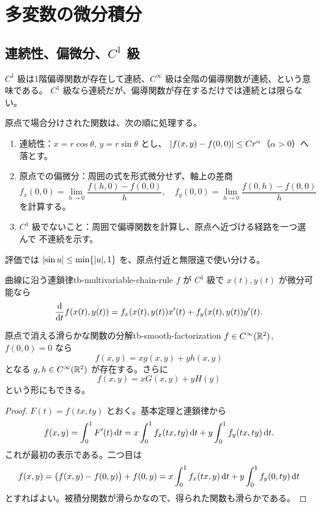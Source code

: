 \chapter{多変数の微分積分}
\label{ch:tb-multivariable}

\section{連続性、偏微分、\texorpdfstring{$C^1$ 級}{C1 級}}

$C^1$ 級は1階偏導関数が存在して連続、$C^\infty$ 級は全階の偏導関数が連続、という意味である。
$C^1$ 級なら連続だが、偏導関数が存在するだけでは連続とは限らない。

原点で場合分けされた関数は、次の順に処理する。
\begin{enumerate}
  \item 連続性：$x=r\cos\theta$, $y=r\sin\theta$ とし、
        $\lvert f(x,y)-f(0,0) \rvert\le Cr^\alpha$（$\alpha>0$）へ落とす。
  \item 原点での偏微分：周囲の式を形式微分せず、軸上の差商
        \[
        f_x(0,0)=\lim_{h\to0}\frac{f(h,0)-f(0,0)}h,
        \quad
        f_y(0,0)=\lim_{h\to0}\frac{f(0,h)-f(0,0)}h
        \]
        を計算する。
  \item $C^1$ 級でないこと：周囲で偏導関数を計算し、原点へ近づける経路を一つ選んで
        不連続を示す。
\end{enumerate}
評価では $\lvert \sin u \rvert\le\min\{\lvert u \rvert,1\}$ を、原点付近と無限遠で使い分ける。

\begin{theorem}{曲線に沿う連鎖律}{tb-multivariable-chain-rule}
$f$ が $C^1$ 級で $x(t),y(t)$ が微分可能なら
\[
\frac{\mathrm{d}}{\mathrm{d} t}f(x(t),y(t))
=f_x(x(t),y(t))x'(t)+f_y(x(t),y(t))y'(t).
\]
\end{theorem}

\begin{proposition}{原点で消える滑らかな関数の分解}{tb-smooth-factorization}
$f\in C^\infty(\mathbb{R}^2)$, $f(0,0)=0$ なら
\[
f(x,y)=xg(x,y)+yh(x,y)
\]
となる $g,h\in C^\infty(\mathbb{R}^2)$ が存在する。さらに
\[
f(x,y)=xG(x,y)+yH(y)
\]
という形にもできる。
\end{proposition}

\begin{proof}
$F(t)=f(tx,ty)$ とおく。基本定理と連鎖律から
\[
f(x,y)=\int_0^1F'(t)\,\mathrm{d} t
=x\int_0^1f_x(tx,ty)\,\mathrm{d} t
+y\int_0^1f_y(tx,ty)\,\mathrm{d} t.
\]
これが最初の表示である。二つ目は
\[
f(x,y)=\bigl(f(x,y)-f(0,y)\bigr)+f(0,y)
=x\int_0^1 f_x(tx,y)\,\mathrm{d} t
+y\int_0^1f_y(0,ty)\,\mathrm{d} t
\]
とすればよい。被積分関数が滑らかなので、得られた関数も滑らかである。
\end{proof}

